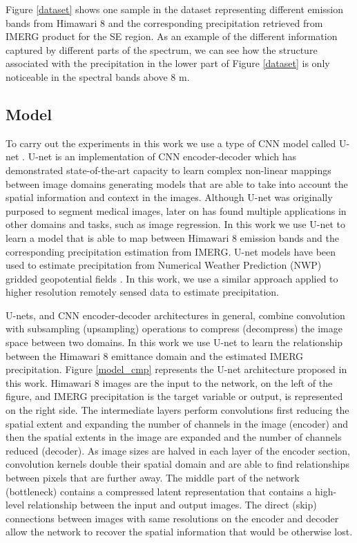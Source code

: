 \documentclass[3p,times]{elsarticle}
\begin{document}
Figure \ref{dataset} shows one sample in the dataset representing different emission bands from Himawari 8 and the corresponding precipitation retrieved from IMERG product for the SE region. As an example of the different information captured by different parts of the spectrum, we can see how the structure associated with the precipitation in the lower part of Figure \ref{dataset} is only noticeable in the spectral bands above 8 \textmu m. 

\subsection{Model}

To carry out the experiments in this work we use a type of CNN model called U-net \citep{ronneberger2015u}. U-net is an implementation of CNN encoder-decoder which has demonstrated state-of-the-art capacity to learn complex non-linear mappings between image domains generating models that are able to take into account the spatial information and context in the images. Although U-net was originally purposed to segment medical images, later on has found multiple applications in other domains and tasks, such as image regression. In this work we use U-net to learn a model that is able to map between Himawari 8 emission bands and the corresponding precipitation estimation from IMERG. U-net models have been used to estimate precipitation from Numerical Weather Prediction (NWP) gridded geopotential fields \citep{larraondo2019data}. In this work, we use a similar approach applied to higher resolution remotely sensed data to estimate precipitation.

U-nets, and CNN encoder-decoder architectures in general, combine convolution with subsampling (upsampling) operations to compress (decompress) the image space between two domains. In this work we use U-net to learn the relationship between the Himawari 8 emittance domain and the estimated IMERG precipitation. Figure \ref{model_cmp} represents the U-net architecture proposed in this work. Himawari 8 images are the input to the network, on the left of the figure, and IMERG precipitation is the target variable or output, is represented on the right side. The intermediate layers perform convolutions first reducing the spatial extent and expanding the number of channels in the image (encoder) and then the spatial extents in the image are expanded and the number of channels reduced (decoder). As image sizes are halved in each layer of the encoder section, convolution kernels double their spatial domain and are able to find relationships between pixels that are further away. The middle part of the network (bottleneck) contains a compressed latent representation that contains a high-level relationship between the input and output images. The direct (skip) connections between images with same resolutions on the encoder and decoder allow the network to recover the spatial information that would be otherwise lost.
\end{document}
